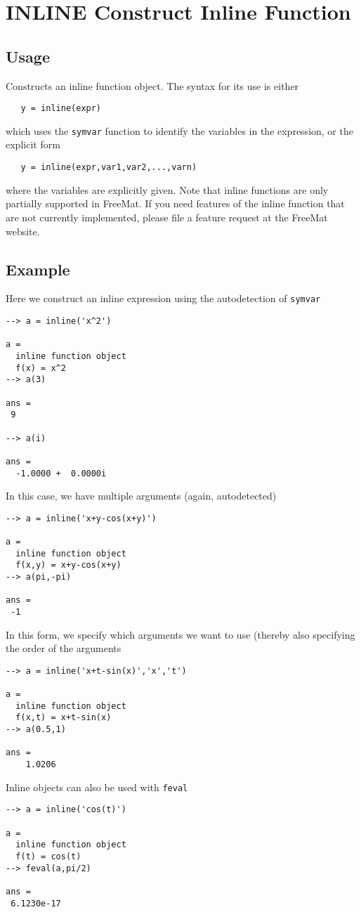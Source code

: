 \section{INLINE Construct Inline Function}

\subsection{Usage}

Constructs an inline function object.  The syntax for its use is
either
\begin{verbatim}
   y = inline(expr)
\end{verbatim}
which uses the \verb|symvar| function to identify the variables in the
expression, or the explicit form
\begin{verbatim}
   y = inline(expr,var1,var2,...,varn)
\end{verbatim}
where the variables are explicitly given.  Note that inline functions
are only partially supported in FreeMat.  If you need features of the
inline function that are not currently implemented, please file a
feature request at the FreeMat website.
\subsection{Example}

Here we construct an inline expression using the autodetection 
of \verb|symvar|
\begin{verbatim}
--> a = inline('x^2')

a = 
  inline function object
  f(x) = x^2
--> a(3)

ans = 
 9 

--> a(i)

ans = 
  -1.0000 +  0.0000i 
\end{verbatim}
In this case, we have multiple arguments (again, autodetected)
\begin{verbatim}
--> a = inline('x+y-cos(x+y)')

a = 
  inline function object
  f(x,y) = x+y-cos(x+y)
--> a(pi,-pi)

ans = 
 -1 
\end{verbatim}
In this form, we specify which arguments we want to use (thereby
also specifying the order of the arguments
\begin{verbatim}
--> a = inline('x+t-sin(x)','x','t')

a = 
  inline function object
  f(x,t) = x+t-sin(x)
--> a(0.5,1)

ans = 
    1.0206 
\end{verbatim}
Inline objects can also be used with \verb|feval|
\begin{verbatim}
--> a = inline('cos(t)')

a = 
  inline function object
  f(t) = cos(t)
--> feval(a,pi/2)

ans = 
 6.1230e-17 
\end{verbatim}
